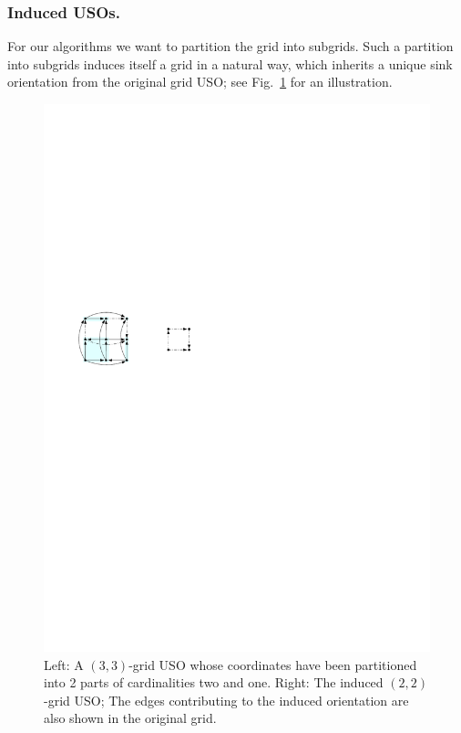 \documentclass[runningheads,a4paper]{llncs}
\begin{document}
\subsubsection{Induced USOs.}
For our algorithms we want to partition the grid into subgrids.
Such a partition into subgrids induces itself a grid in a natural way,
which inherits a unique sink orientation from the original grid USO; see Fig.~\ref{fig:example_induced_orientation} for an illustration.
  \begin{figure}[t] 
  	\centering
  	\includegraphics[scale=1]{induced_orientation_ex.pdf}
  	\caption{\small Left: A $(3,3)$-grid USO whose %
  	coordinates have been partitioned into 2 parts of cardinalities two and one. Right: The induced $(2,2)$-grid USO; The edges contributing to the induced orientation are also shown in the original grid.}
  	\label{fig:example_induced_orientation}
  \end{figure}
\end{document}
